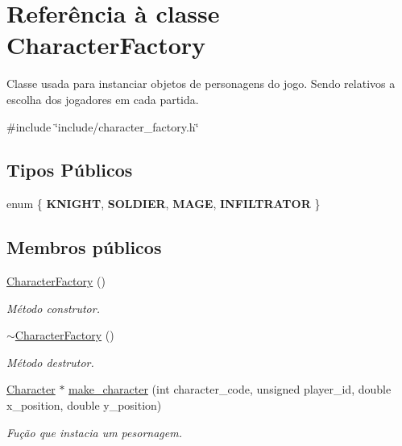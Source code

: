 \hypertarget{classCharacterFactory}{}\section{Referência à classe Character\+Factory}
\label{classCharacterFactory}


Classe usada para instanciar objetos de personagens do jogo. Sendo relativos a escolha dos jogadores em cada partida.  




{\ttfamily \#include \char`\"{}include/character\+\_\+factory.\+h\char`\"{}}

\subsection*{Tipos Públicos}
\begin{DoxyCompactItemize}
\item 
enum \{ {\bfseries K\+N\+I\+G\+HT}, 
{\bfseries S\+O\+L\+D\+I\+ER}, 
{\bfseries M\+A\+GE}, 
{\bfseries I\+N\+F\+I\+L\+T\+R\+A\+T\+OR}
 \}
\end{DoxyCompactItemize}
\subsection*{Membros públicos}
\begin{DoxyCompactItemize}
\item 
\mbox{\label{classCharacterFactory_a0014a7de42b681ce872c728ea91bcfc1}} 
\mbox{\hyperlink{classCharacterFactory_a0014a7de42b681ce872c728ea91bcfc1}{Character\+Factory}} ()
\begin{DoxyCompactList}\small\item\em Método construtor. \end{DoxyCompactList}\item 
\mbox{\label{classCharacterFactory_a27508feea862d22571bb6b9344f34f44}} 
\mbox{\hyperlink{classCharacterFactory_a27508feea862d22571bb6b9344f34f44}{$\sim$\+Character\+Factory}} ()
\begin{DoxyCompactList}\small\item\em Método destrutor. \end{DoxyCompactList}\item 
\mbox{\hyperlink{classCharacter}{Character}} $\ast$ \mbox{\hyperlink{classCharacterFactory_a6ebcf8e9408d89dc4c40ef12e9d09c15}{make\+\_\+character}} (int character\+\_\+code, unsigned player\+\_\+id, double x\+\_\+position, double y\+\_\+position)
\begin{DoxyCompactList}\small\item\em Fução que instacia um pesornagem. \end{DoxyCompactList}\end{DoxyCompactItemize}
